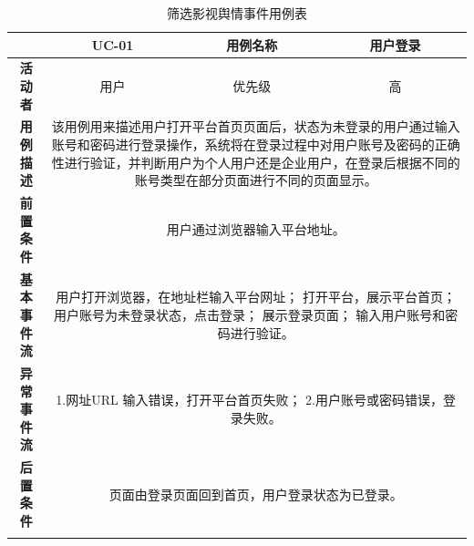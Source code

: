 \begin{longtable}[c]{c|ccc}
	\caption{筛选影视舆情事件用例表}
	\label{tab:tab11}\\
	\shline
	\multicolumn{1}{c|}{\textbf{用例编号}} & \multicolumn{1}{c|}{UC-01} & \multicolumn{1}{c|}{用例名称} &  用户登录\\ \hline
	\endhead
	\multicolumn{1}{c|}{\textbf{活动者}} & \multicolumn{1}{c|}{用户} & \multicolumn{1}{c|}{优先级} &高  \\ \hline
	\textbf{用例描述} & \multicolumn{3}{p{12cm}}{该用例用来描述用户打开平台首页页面后，状态为未登录的用户通过输入账号和密码进行登录操作，系统将在登录过程中对用户账号及密码的正确性进行验证，并判断用户为个人用户还是企业用户，在登录后根据不同的账号类型在部分页面进行不同的页面显示。} \\ \hline
	\textbf{前置条件}& \multicolumn{3}{p{12cm}}{用户通过浏览器输入平台地址。} \\ \hline
	\textbf{基本事件流}& \multicolumn{3}{p{12cm}}{用户打开浏览器，在地址栏输入平台网址；\newline
		打开平台，展示平台首页；\newline
		用户账号为未登录状态，点击登录；\newline
		展示登录页面；\newline
		输入用户账号和密码进行验证。} \\ \hline
	\textbf{异常事件流}& \multicolumn{3}{p{12cm}}{1.网址URL 输入错误，打开平台首页失败；\newline
		2.用户账号或密码错误，登录失败。
	} \\ \hline
	\textbf{后置条件}& \multicolumn{3}{p{12cm}}{页面由登录页面回到首页，用户登录状态为已登录。} \\ \shline
\end{longtable}


